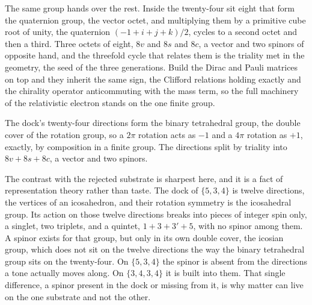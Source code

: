 The same group hands over the rest. Inside the twenty-four sit eight that form the quaternion group, the vector octet, and multiplying them by a primitive cube root of unity, the quaternion $(-1 + i + j + k)/2$, cycles to a second octet and then a third. Three octets of eight, $8v$ and $8s$ and $8c$, a vector and two spinors of opposite hand, and the threefold cycle that relates them is the triality met in the geometry, the seed of the three generations. Build the Dirac and Pauli matrices on top and they inherit the same sign, the Clifford relations holding exactly and the chirality operator anticommuting with the mass term, so the full machinery of the relativistic electron stands on the one finite group.

\begin{result}
The dock's twenty-four directions form the binary tetrahedral group, the double cover of the rotation group, so a $2\pi$ rotation acts as $-1$ and a $4\pi$ rotation as $+1$, exactly, by composition in a finite group. The directions split by triality into $8v + 8s + 8c$, a vector and two spinors. \cite{pollard2026vibetest}
\end{result}

The contrast with the rejected substrate is sharpest here, and it is a fact of representation theory rather than taste. The dock of $\{5,3,4\}$ is twelve directions, the vertices of an icosahedron, and their rotation symmetry is the icosahedral group. Its action on those twelve directions breaks into pieces of integer spin only, a singlet, two triplets, and a quintet, $1 + 3 + 3' + 5$, with no spinor among them. A spinor exists for that group, but only in its own double cover, the icosian group, which does not sit on the twelve directions the way the binary tetrahedral group sits on the twenty-four. On $\{5,3,4\}$ the spinor is absent from the directions a tone actually moves along. On $\{3,4,3,4\}$ it is built into them. That single difference, a spinor present in the dock or missing from it, is why matter can live on the one substrate and not the other.
